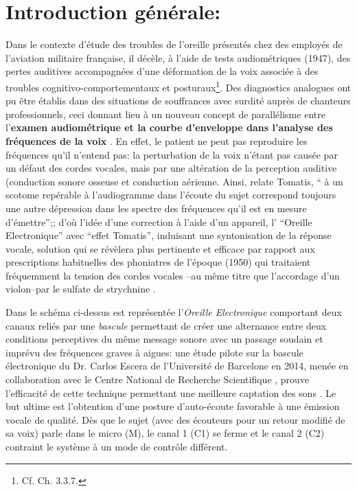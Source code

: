 \section {Introduction générale:}
Dans le contexte d'étude des troubles de
l'oreille présentés chez des employés de l'aviation militaire
française, il décèle, à l'aide
de tests audiométriques
 (1947), des pertes auditives accompagnées d'une
déformation de la voix associée à des troubles
cognitivo-comportementaux et posturaux\footnote{Cf. Ch. 3.3.7.}.
Des diagnostics analogues ont pu être établis dans des situations
de souffrances avec surdité auprès de chanteurs professionnels,
ceci donnant lieu
à un nouveau concept de
parallélisme entre l'\textbf{examen audiométrique et la courbe
d'enveloppe dans l'analyse des fréquences de la voix} \autocite {tomatisoreilletvie}.
En effet, le patient ne peut pas reproduire les fréquences qu'il
n'entend pas:
la perturbation de la voix n'étant pas causée par un défaut des cordes
vocales, mais par une altération de la perception auditive (conduction
sonore osseuse et conduction aérienne. Ainsi, relate Tomatis, \enquote{ à un scotome repérable à l'audiogramme dans l'écoute du sujet correspond toujours une autre dépression dans les spectre des fréquences qu'il est en mesure d'émettre};\autocite [75] {tomatisoreilletvie}; d'où
l'idée d'une correction à l'aide d'un appareil, l' ``Oreille
Electronique'' avec ``effet Tomatis'', induisant
une syntonisation de la réponse vocale, solution qui se révèlera plus pertinente et efficace par rapport aux prescriptions habituelles des phoniatres de
l'époque (1950) qui traitaient fréquemment la tension des cordes vocales --au même titre que
l'accordage d'un violon--par le sulfate de
strychnine \autocite {tomatisoreilletvie}.

Dans le schéma ci-dessus est représentée l'\textit{Oreille Electronique}
comportant deux canaux reliés par une
\textit{bascule}  permettant de créer une alternance entre deux conditions perceptives du même message sonore avec un passage soudain et imprévu des fréquences graves à aigues: une étude pilote sur la bascule électronique du Dr. Carlos Escera
de l'Université de Barcelone en 2014, menée en collaboration avec le
Centre National de Recherche Scientifique \autocite{escera-key}, prouve l'efficacité de cette technique permettant
une meilleure
captation des sons \href {http://tomatisassociation.org/scientific-validation-of-the-tomatis-effect-
eeg-recordings-of-sound-from-brainstem-to-cerebral-cortex-encoding-university-of
-barcelona-2014/} \autocite {tomatisassociation.org}.
Le but ultime est l'obtention d'une posture d'auto-écoute favorable à une
          émission vocale de qualité.
Dès que le sujet (avec
des écouteurs pour un retour modifié de sa voix) parle
dans le micro (M), le canal 1 (C1) se ferme et  le canal 2 (C2) contraint le
système à un mode de contrôle différent.

